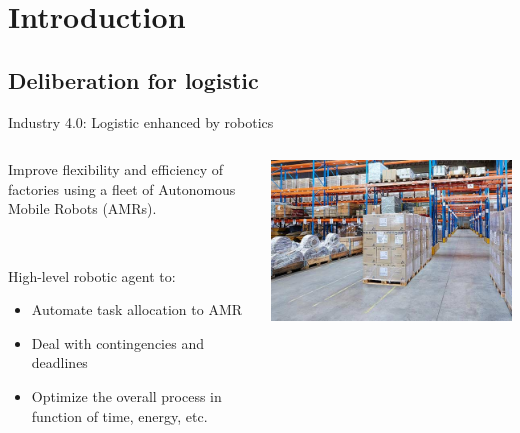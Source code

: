 \section{Introduction}
\subsection{Deliberation for logistic}

\begin{frame}{Industry 4.0: Logistic enhanced by robotics}
    \centering
\begin{columns}
    \begin{column}{0.5\textwidth}
        Improve flexibility and efficiency of factories using a fleet of Autonomous Mobile Robots (AMRs).

        ~~

        High-level robotic agent to:
        \begin{itemize}
            \pause
            \item Automate task allocation to AMR
            \pause
            \item Deal with contingencies and deadlines
            \pause
            \item Optimize the overall process in function of time, energy, etc.
        \end{itemize}
    \end{column}
    \begin{column}{0.5\textwidth}
        \includegraphics[width = \textwidth]{images/logisticsolutions.jpg}
    \end{column}
\end{columns}
\end{frame}

